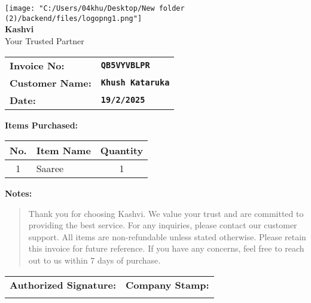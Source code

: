 \documentclass{article}
\begin{document}
        \begin{center}
            \texttt{[image: "C:/Users/04khu/Desktop/New folder (2)/backend/files/logopng1.png"]} \\[1em]  
            {\Huge \textbf{Kashvi}} \\[0.5em]
            {\large Your Trusted Partner} \\[2em]
        \end{center}

        \noindent
        \begin{tabular}{@{}ll@{}}
            \textbf{Invoice No:} & \texttt{\textbf{QB5VYVBLPR}} \\
            \textbf{Customer Name:} & \texttt{\textbf{Khush Kataruka}} \\
            \textbf{Date:} & \texttt{\textbf{19/2/2025}} \\
        \end{tabular}

        \vspace{2em}

        \textbf{Items Purchased:} \\[1em]

        \begin{tabular}{|c|l|c|}
            \hline
            \textbf{No.} & \textbf{Item Name} & \textbf{Quantity} \\
            \hline
            1 & Saaree & 1 \\ \hline
        \end{tabular}

        \vspace{2em}

        \noindent
        \textbf{Notes:} \\[0.5em]
        \begin{quote}
            Thank you for choosing Kashvi. We value your trust and are committed to providing the best service.  
            For any inquiries, please contact our customer support.  
            All items are non-refundable unless stated otherwise.  
            Please retain this invoice for future reference.  
            If you have any concerns, feel free to reach out to us within 7 days of purchase.
        \end{quote}

        \vspace{1em}

        \noindent
        \begin{tabular}{@{}p{}p{}@{}}
            \textbf{Authorized Signature:} & \textbf{Company Stamp:} \\
            \vspace{2cm} & \vspace{2cm} \\
        \end{tabular}

        
\end{document}
